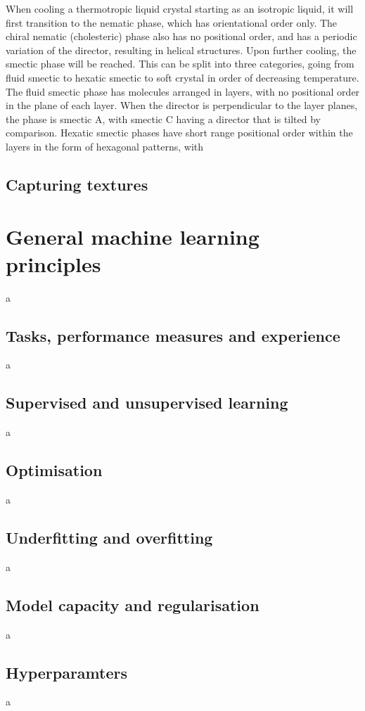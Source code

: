 \documentclass[12pt]{article}
\begin{document}
When cooling a thermotropic liquid crystal starting as an isotropic liquid, it will first transition to the nematic phase, which has orientational order only. The chiral nematic (cholesteric) phase also has no positional order, and has a periodic variation of the director, resulting in helical structures. Upon further cooling, the smectic phase will be reached. This can be split into three categories, going from fluid smectic to hexatic smectic to soft crystal in order of decreasing temperature. The fluid smectic phase has molecules arranged in layers, with no positional order in the plane of each layer. When the director is perpendicular to the layer planes, the phase is smectic A, with smectic C having a director that is tilted by comparison. Hexatic smectic phases have short range positional order within the layers in the form of hexagonal patterns, with

\subsection{Capturing textures}
\section{General machine learning principles}
a
\subsection{Tasks, performance measures and experience}
a
\subsection{Supervised and unsupervised learning}
a
\subsection{Optimisation}
a
\subsection{Underfitting and overfitting}
a
\subsection{Model capacity and regularisation}
a
\subsection{Hyperparamters}
a
\end{document}
